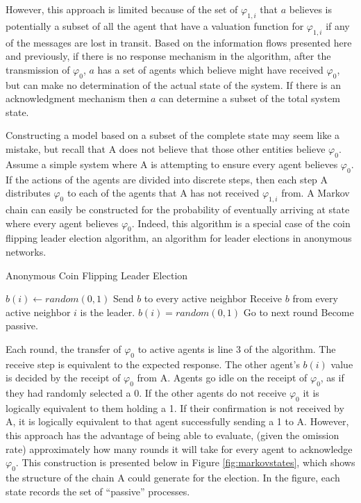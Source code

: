 However, this approach is limited because of the set of $\varphi_{1,i}$ that $a$ believes is potentially a subset of all the agent that have a valuation function for $\varphi_{1,i}$ if any of the messages are lost in transit. Based on the information flows presented here and previously, if there is no response mechanism in the algorithm, after the transmission of $\varphi_0$, $a$ has a set of agents which believe might have received $\varphi_0$, but can make no determination of the actual state of the system. If there is an acknowledgment mechanism then $a$ can determine a subset of the total system state. 

Constructing a model based on a subset of the complete state may seem like a mistake, but recall that A does not believe that those other entities believe $\varphi_0$. Assume a simple system where A is attempting to ensure every agent believes $\varphi_0$. If the actions of the agents are divided into discrete steps, then each step A distributes $\varphi_0$ to each of the agents that A has not received $\varphi_{1,i}$ from. A Markov chain can easily be constructed for the probability of eventually arriving at state where every agent believes $\varphi_0$. Indeed, this algorithm is a special case of the coin flipping leader election algorithm, an algorithm for leader elections in anonymous networks.

\begin{algorithm}
\caption{Anonymous Coin Flipping Leader Election}
\label{alg:coinflip2}
\begin{algorithmic}[1]
\small
\State $b(i) \gets random(0,1)$
\State Send $b$ to every active neighbor
\State Receive $b$ from every active neighbor
	\State $i$ is the leader.
		\State $b(i) = random(0,1)$
		\State Go to next round
		\State Become passive.
	\EndIf
\end{algorithmic}
\end{algorithm}

Each round, the transfer of $\varphi_0$ to active agents is line 3 of the algorithm. The receive step is equivalent to the expected response. The other agent's $b(i)$ value is decided by the receipt of $\varphi_0$ from A. Agents go idle on the receipt of $\varphi_0$, as if they had randomly selected a 0. If the other agents do not receive $\varphi_0$ it is logically equivalent to them holding a 1. If their confirmation is not received by A, it is logically equivalent to that agent successfully sending a 1 to A. However, this approach has the advantage of being able to evaluate, (given the omission rate) approximately how many rounds it will take for every agent to acknowledge $\varphi_0$. This construction is presented below in Figure \ref{fig:markovstates}, which shows the structure of the chain A could generate for the election. In the figure, each state records the set of ``passive'' processes\cite{markov-anon-elections}.

